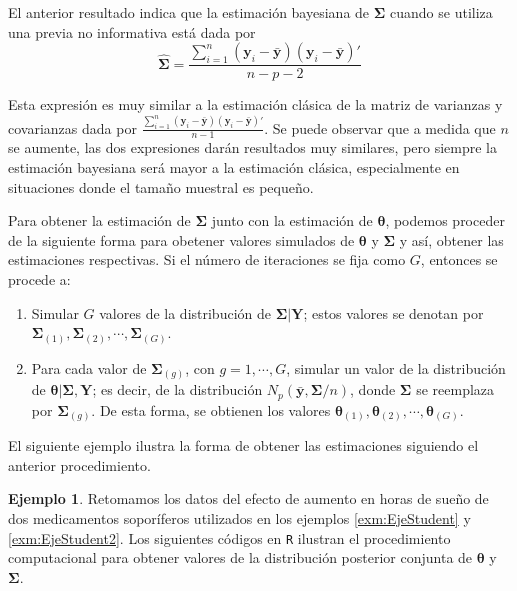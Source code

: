 \documentclass[
  10pt,
  spanish,
]{book}
\providecommand{\tightlist}{%
  \setlength{\itemsep}{0pt}\setlength{\parskip}{0pt}}
\theoremstyle{definition}
\theoremstyle{definition}
\newtheorem{example}{Ejemplo}[chapter]
\theoremstyle{definition}
\theoremstyle{definition}
\theoremstyle{remark}
\begin{document}
El anterior resultado indica que la estimación bayesiana de \(\boldsymbol \Sigma\) cuando se utiliza una previa no informativa está dada por
\begin{equation*}
\hat{\boldsymbol \Sigma}=\frac{\sum_{i=1}^n(\mathbf{y}_i-\bar{\mathbf{y}})(\mathbf{y}_i-\bar{\mathbf{y}})'}{n-p-2}
\end{equation*}

Esta expresión es muy similar a la estimación clásica de la matriz de varianzas y covarianzas dada por \(\frac{\sum_{i=1}^n(\mathbf{y}_i-\bar{\mathbf{y}})(\mathbf{y}_i-\bar{\mathbf{y}})'}{n-1}\). Se puede observar que a medida que \(n\) se aumente, las dos expresiones darán resultados muy similares, pero siempre la estimación bayesiana será mayor a la estimación clásica, especialmente en situaciones donde el tamaño muestral es pequeño.

Para obtener la estimación de \(\boldsymbol \Sigma\) junto con la estimación de \(\boldsymbol \theta\), podemos proceder de la siguiente forma para obetener valores simulados de \(\boldsymbol \theta\) y \(\boldsymbol \Sigma\) y así, obtener las estimaciones respectivas. Si el número de iteraciones se fija como \(G\), entonces se procede a:

\begin{enumerate}
\def\labelenumi{\arabic{enumi}.}
\tightlist
\item
  Simular \(G\) valores de la distribución de \(\boldsymbol \Sigma|\mathbf{Y}\); estos valores se denotan por \(\boldsymbol \Sigma_{(1)},\boldsymbol \Sigma_{(2)},\cdots,\boldsymbol \Sigma_{(G)}\).
\item
  Para cada valor de \(\boldsymbol \Sigma_{(g)}\), con \(g=1,\cdots,G\), simular un valor de la distribución de \(\boldsymbol \theta|\boldsymbol \Sigma,\mathbf{Y}\); es decir, de la distribución \(N_p(\bar{\mathbf{y}}, \boldsymbol \Sigma/n)\), donde \(\boldsymbol \Sigma\) se reemplaza por \(\boldsymbol \Sigma_{(g)}\). De esta forma, se obtienen los valores \(\boldsymbol \theta_{(1)},\boldsymbol \theta_{(2)},\cdots,\boldsymbol \theta_{(G)}\).
\end{enumerate}

El siguiente ejemplo ilustra la forma de obtener las estimaciones siguiendo el anterior procedimiento.

\begin{example}
\protect\hypertarget{exm:EjeStudent3}{}{\label{exm:EjeStudent3} }Retomamos los datos del efecto de aumento en horas de sueño de dos medicamentos soporíferos utilizados en los ejemplos \ref{exm:EjeStudent} y \ref{exm:EjeStudent2}. Los siguientes códigos en \texttt{R} ilustran el procedimiento computacional para obtener valores de la distribución posterior conjunta de \(\boldsymbol \theta\) y \(\boldsymbol \Sigma\).
\end{example}
\end{document}
